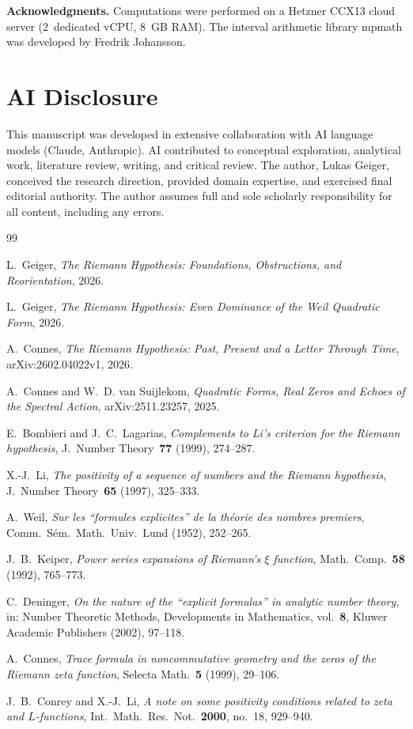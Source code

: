 \documentclass[12pt,a4paper]{article}
\theoremstyle{definition}
\theoremstyle{remark}
\begin{document}
\bigskip
\noindent\textbf{Acknowledgments.} Computations were performed on a Hetzner CCX13 cloud server (2~dedicated vCPU, 8~GB RAM). The interval arithmetic library mpmath was developed by Fredrik Johansson.


\section*{AI Disclosure}

This manuscript was developed in extensive collaboration with AI language models (Claude, Anthropic). AI contributed to conceptual exploration, analytical work, literature review, writing, and critical review. The author, Lukas Geiger, conceived the research direction, provided domain expertise, and exercised final editorial authority. The author assumes full and sole scholarly responsibility for all content, including any errors.


\begin{thebibliography}{99}

L.~Geiger, \emph{The Riemann Hypothesis: Foundations, Obstructions, and Reorientation}, 2026.

L.~Geiger, \emph{The Riemann Hypothesis: Even Dominance of the Weil Quadratic Form}, 2026.

A.~Connes, \emph{The Riemann Hypothesis: Past, Present and a Letter Through Time}, arXiv:2602.04022v1, 2026.

A.~Connes and W.~D. van Suijlekom, \emph{Quadratic Forms, Real Zeros and Echoes of the Spectral Action}, arXiv:2511.23257, 2025.

E.~Bombieri and J.~C.~Lagarias, \emph{Complements to Li's criterion for the Riemann hypothesis}, J.~Number Theory~\textbf{77} (1999), 274--287.

X.-J.~Li, \emph{The positivity of a sequence of numbers and the Riemann hypothesis}, J.~Number Theory~\textbf{65} (1997), 325--333.

A.~Weil, \emph{Sur les ``formules explicites'' de la th\'eorie des nombres premiers}, Comm.~S\'em.~Math.~Univ.~Lund (1952), 252--265.

J.~B.~Keiper, \emph{Power series expansions of Riemann's $\xi$ function}, Math.~Comp.~\textbf{58} (1992), 765--773.

C.~Deninger, \emph{On the nature of the ``explicit formulas'' in analytic number theory}, in: Number Theoretic Methods, Developments in Mathematics, vol.~\textbf{8}, Kluwer Academic Publishers (2002), 97--118.

A.~Connes, \emph{Trace formula in noncommutative geometry and the zeros of the Riemann zeta function}, Selecta Math.~\textbf{5} (1999), 29--106.

J.~B.~Conrey and X.-J.~Li, \emph{A note on some positivity conditions related to zeta and $L$-functions}, Int.~Math.~Res.~Not.~\textbf{2000}, no.~18, 929--940.

\end{thebibliography}
\end{document}
